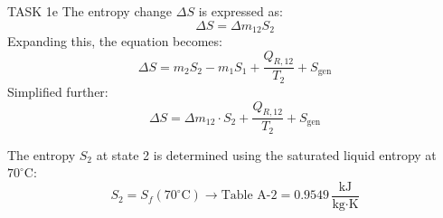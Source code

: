 TASK 1e  
The entropy change \( \Delta S \) is expressed as:  
\[
\Delta S = \Delta m_{12} S_2
\]  
Expanding this, the equation becomes:  
\[
\Delta S = m_2 S_2 - m_1 S_1 + \frac{Q_{R,12}}{T_2} + S_{\text{gen}}
\]  
Simplified further:  
\[
\Delta S = \Delta m_{12} \cdot S_2 + \frac{Q_{R,12}}{T_2} + S_{\text{gen}}
\]  

The entropy \( S_2 \) at state 2 is determined using the saturated liquid entropy at \( 70^\circ\text{C} \):  
\[
S_2 = S_f(70^\circ\text{C}) \rightarrow \text{Table A-2} = 0.9549 \, \frac{\text{kJ}}{\text{kg·K}}
\]